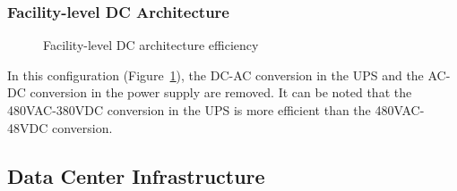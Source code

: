 {            \subsubsection*{Facility-level DC Architecture}
                \begin{figure}[h!tb]
                    \centering
                    \caption{Facility-level DC architecture efficiency}
                    \label{fig:facility_level_dc_efficiency}
                \end{figure}
                In this configuration (Figure~\ref{fig:facility_level_dc_efficiency}), the DC-AC conversion in the UPS and the AC-DC conversion in the power supply are removed. It can be noted that the 480VAC-380VDC conversion in the UPS is more efficient than the 480VAC-48VDC conversion.
            
        \subsection{Data Center Infrastructure} \label{sec2:data_center_infrastructure}
}
